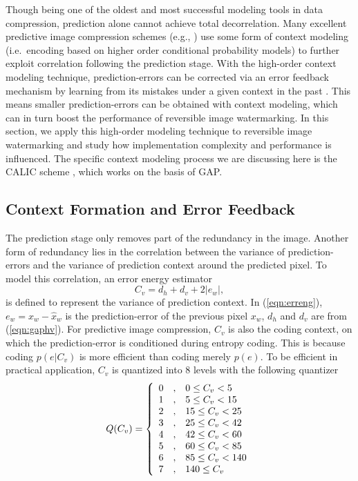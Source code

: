 \documentclass[journal]{IEEEtran}
\begin{document}
Though being one of the oldest and most successful modeling tools in data compression, prediction
alone cannot achieve total decorrelation. Many excellent predictive image compression
schemes (e.g., \cite{Loco00ip,Wu97calic2,Wu97calic}) use some form of context modeling (i.e.\
encoding based on higher order conditional probability models) \cite{Weinberger97} to further
exploit correlation following the prediction stage. With the high-order context modeling technique,
prediction-errors can be corrected via an error feedback mechanism by learning from its mistakes
under a given context in the past \cite{Wu97calic2,Wu97calic}. This means smaller prediction-errors
can be obtained with context modeling, which can in turn boost the performance of reversible image
watermarking. In this section, we apply this high-order modeling technique to reversible image
watermarking and study how implementation complexity and performance is influenced. The
specific context modeling process we are discussing here is the CALIC scheme \cite{Wu97calic2},
which works on the basis of GAP. 

\subsection{Context Formation and Error Feedback}

The prediction stage only removes part of the redundancy in the image. Another form of redundancy
lies in the correlation between the variance of prediction-errors and the variance of prediction
context around the predicted pixel. To model this correlation, an error energy estimator 
\begin{equation}\label{eqn:erreng}
    C_v = d_h + d_v + 2|e_w|,
\end{equation}
is defined to represent the variance of prediction context. In (\ref{eqn:erreng}), $e_w = x_w -
\hat{x}_w$ is the prediction-error of the previous pixel $x_w$, $d_h$ and $d_v$ are from
(\ref{eqn:gaphv}). For predictive image compression, $C_v$ is also the coding context, on which the
prediction-error is conditioned during entropy coding. This is because coding $p(e|C_v)$ is more
efficient than coding merely $p(e)$. To be efficient in practical application, $C_v$ is quantized
into 8 levels with the following quantizer 
\begin{equation}\label{eqn:errquan}
    Q(C_v) = \left\{\begin{array}{l@{\quad,\quad}l}
	0 & 0 \le C_v < 5 \\
	1 & 5 \le C_v < 15 \\
	2 & 15 \le C_v < 25 \\
	3 & 25 \le C_v < 42 \\
	4 & 42 \le C_v < 60 \\
	5 & 60 \le C_v < 85 \\
	6 & 85 \le C_v < 140 \\
	7 & 140 \le C_v \\
    \end{array}\right.
\end{equation}
\end{document}
